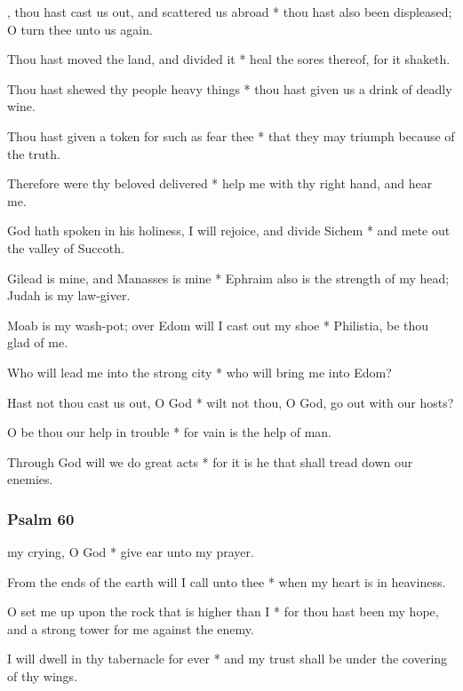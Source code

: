 
, thou hast cast us out, and scattered us abroad * thou hast also been displeased; O turn thee unto us again.

Thou hast moved the land, and divided it * heal the sores thereof, for it shaketh.

Thou hast shewed thy people heavy things * thou hast given us a drink of deadly wine.

Thou hast given a token for such as fear thee * that they may triumph because of the truth.

Therefore were thy beloved delivered * help me with thy right hand, and hear me.

God hath spoken in his holiness, I will rejoice, and divide Sichem * and mete out the valley of Succoth.

Gilead is mine, and Manasses is mine * Ephraim also is the strength of my head; Judah is my law-giver.

Moab is my wash-pot; over Edom will I cast out my shoe * Philistia, be thou glad of me.

Who will lead me into the strong city * who will bring me into Edom?

Hast not thou cast us out, O God * wilt not thou, O God, go out with our hosts?

O be thou our help in trouble * for vain is the help of man.

Through God will we do great acts * for it is he that shall tread down our enemies.

\subsubsection{Psalm 60}


 my crying, O God * give ear unto my prayer.

From the ends of the earth will I call unto thee * when my heart is in heaviness.

O set me up upon the rock that is higher than I * for thou hast been my hope, and a strong tower for me against the enemy.

I will dwell in thy tabernacle for ever * and my trust shall be under the covering of thy wings.

